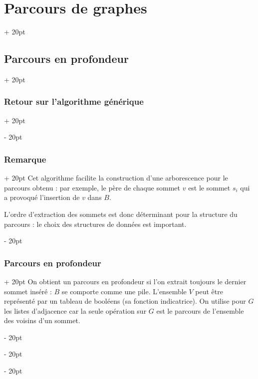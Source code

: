 \documentclass[a4paper, 12pt, twoside]{article}
\newcommand{\ind}[1][20pt]{\advance\leftskip + #1}
\newcommand{\deind}[1][20pt]{\advance\leftskip - #1}
\newenvironment{indt}[2][20pt]{#2 \par \ind[#1]}{\par \deind} %
\begin{document}
\begin{indt}{\section{Parcours de graphes}}
\begin{indt}{\subsection{Parcours en profondeur}}
\begin{indt}{\subsubsection{Retour sur l'algorithme générique}}
\begin{center}
                \end{center}
            \end{indt}

            \vspace{12pt}
            
            \begin{indt}{\subsubsection{Remarque}}
                Cet algorithme facilite la construction d'une arborescence pour le parcours obtenu : par exemple, le père de chaque sommet $v$ est le sommet $s_i$ qui a provoqué l'insertion de $v$ dans $B$.

                L'ordre d'extraction des sommets est donc déterminant pour la structure du parcours : le choix des structures de données est important.
            \end{indt}

            \vspace{12pt}
            
            \begin{indt}{\subsubsection{Parcours en profondeur}}
                On obtient un parcours en profondeur si l'on extrait toujours le dernier sommet inséré : $B$ se comporte comme une pile.
                L'ensemble $V$ peut être représenté par un tableau de booléens (sa fonction indicatrice).
                On utilise pour $G$ les listes d'adjacence car la seule opération sur $G$ est le parcours de l'ensemble des voisins d'un sommet.


\end{indt}
\end{indt}
\end{indt}
\end{document}

